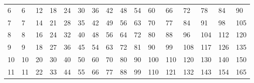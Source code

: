 \begin{table}[]
\begin{tabular}{|l|lllllllllllllll}
6                       & 6                      & 12                     & 18                     & 24                     & 30                     & 36                     & 42                     & 48                     & 54                     & 60                      & 66                      & 72                      & 78                      & 84                      & 90                      \\ \cline{1-1}
7                       & 7                      & 14                     & 21                     & 28                     & 35                     & 42                     & 49                     & 56                     & 63                     & 70                      & 77                      & 84                      & 91                      & 98                      & 105                     \\ \cline{1-1}
8                       & 8                      & 16                     & 24                     & 32                     & 40                     & 48                     & 56                     & 64                     & 72                     & 80                      & 88                      & 96                      & 104                     & 112                     & 120                     \\ \cline{1-1}
9                       & 9                      & 18                     & 27                     & 36                     & 45                     & 54                     & 63                     & 72                     & 81                     & 90                      & 99                      & 108                     & 117                     & 126                     & 135                     \\ \cline{1-1}
10                      & 10                     & 20                     & 30                     & 40                     & 50                     & 60                     & 70                     & 80                     & 90                     & 100                     & 110                     & 120                     & 130                     & 140                     & 150                     \\ \cline{1-1}
11                      & 11                     & 22                     & 33                     & 44                     & 55                     & 66                     & 77                     & 88                     & 99                     & 110                     & 121                     & 132                     & 143                     & 154                     & 165                     \\ \cline{1-1}

\end{tabular}
\end{table}
